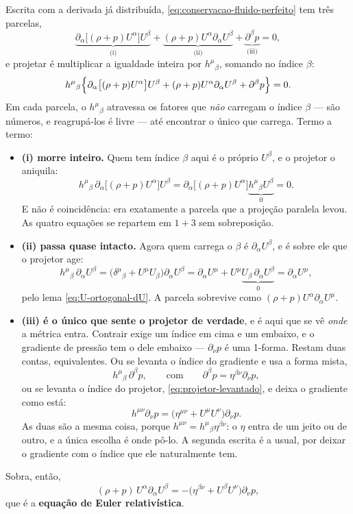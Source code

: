 \documentclass[12pt,a4paper,oneside]{book}
\theoremstyle{rgplain}
\theoremstyle{rgremark}
\begin{document}
Escrita com a derivada já distribuída,
\eqref{eq:conservacao-fluido-perfeito} tem três parcelas,
\[
  \underbrace{\partial_\alpha\bigl[(\rho+p)U^\alpha\bigr]U^\beta}_{\text{(i)}}
  +\underbrace{(\rho+p)U^\alpha\partial_\alpha U^\beta}_{\text{(ii)}}
  +\underbrace{\partial^\beta p}_{\text{(iii)}}=0 ,
\]
e projetar é multiplicar a igualdade inteira por $h^{\mu}{}_{\beta}$, somando
no índice $\beta$:
\[
  h^{\mu}{}_{\beta}\Bigl\{
    \partial_\alpha\bigl[(\rho+p)U^\alpha\bigr]U^{\beta}
    +(\rho+p)U^{\alpha}\partial_\alpha U^{\beta}
    +\partial^{\beta}p
  \Bigr\}=0 .
\]
Em cada parcela, o $h^{\mu}{}_{\beta}$ atravessa os fatores que \emph{não}
carregam o índice $\beta$ --- são números, e reagrupá-los é livre --- até
encontrar o único que carrega. Termo a termo:
\begin{itemize}[leftmargin=1.4em,itemsep=0.4em]
  \item \textbf{(i) morre inteiro.} Quem tem índice $\beta$ aqui é o próprio
  $U^{\beta}$, e o projetor o aniquila:
  \[
    h^{\mu}{}_{\beta}\,\partial_\alpha\bigl[(\rho+p)U^{\alpha}\bigr]U^{\beta}
     =\partial_\alpha\bigl[(\rho+p)U^{\alpha}\bigr]
      \underbrace{h^{\mu}{}_{\beta}U^{\beta}}_{0}=0 .
  \]
  E não é coincidência: era exatamente a parcela que a projeção paralela
  levou. As quatro equações se repartem em $1+3$ sem sobreposição.
  \item \textbf{(ii) passa quase intacto.} Agora quem carrega o $\beta$ é
  $\partial_\alpha U^{\beta}$, e é sobre ele que o projetor age:
  \[
    h^{\mu}{}_{\beta}\,\partial_\alpha U^{\beta}
     =\bigl(\delta^{\mu}{}_{\beta}+U^{\mu}U_{\beta}\bigr)\partial_\alpha U^{\beta}
     =\partial_\alpha U^{\mu}
      +U^{\mu}\underbrace{U_{\beta}\,\partial_\alpha U^{\beta}}_{0}
     =\partial_\alpha U^{\mu} ,
  \]
  pelo lema \eqref{eq:U-ortogonal-dU}. A parcela sobrevive como
  $(\rho+p)U^{\alpha}\partial_\alpha U^{\mu}$.
  \item \textbf{(iii) é o único que sente o projetor de verdade}, e é aqui que se vê \emph{onde} a métrica entra. Contrair exige um índice em
  cima e um embaixo, e o gradiente de pressão tem o dele embaixo --- $\partial_\nu p$
  é uma 1-forma. Restam duas contas, equivalentes. Ou se levanta o índice do
  gradiente e usa a forma mista,
  \[
    h^{\mu}{}_{\beta}\,\partial^{\beta}p ,
    \qquad\text{com}\qquad
    \partial^{\beta}p=\eta^{\beta\nu}\partial_\nu p ,
  \]
  ou se levanta o índice do projetor, \eqref{eq:projetor-levantado}, e deixa o
  gradiente como está:
  \[
    h^{\mu\nu}\partial_\nu p
     =\bigl(\eta^{\mu\nu}+U^{\mu}U^{\nu}\bigr)\partial_\nu p .
  \]
  As duas são a mesma coisa, porque $h^{\mu\nu}=h^{\mu}{}_{\beta}\eta^{\beta\nu}$:
  o $\eta$ entra de um jeito ou de outro, e a única escolha é onde pô-lo. A
  segunda escrita é a usual, por deixar o gradiente com o índice que ele
  naturalmente tem.
\end{itemize}
Sobra, então,
\begin{equation}
  (\rho+p)\,U^\alpha\partial_\alpha U^\beta
  =-\bigl(\eta^{\beta\nu}+U^\beta U^\nu\bigr)\partial_\nu p ,
  \label{eq:euler-relativistica}
\end{equation}
que é a \textbf{equação de Euler relativística}.
\end{document}
